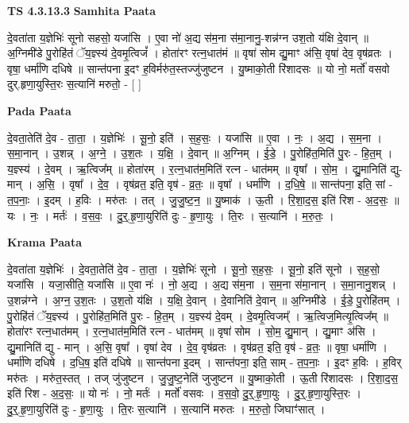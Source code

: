 \documentclass[17pt]{extarticle}
\begin{document}
\textbf{TS 4.3.13.3 } \newline
\textbf{Samhita Paata} \newline

दे॒वता॑ता य॒ज्ञेभिः॑ सूनो सहसो॒ यजा॑सि । ए॒वा नो॑ अ॒द्य स॑म॒ना स॑मा॒नानु॒-शन्न॑ग्न उश॒तो य॑क्षि दे॒वान् ॥ अ॒ग्निमी॑डे पु॒रोहि॑तं ॅय॒ज्ञ्स्य॑ दे॒वमृ॒त्विजं᳚ । होता॑रꣳ रत्न॒धात॑मं ॥ वृषा॑ सोम द्यु॒माꣳ अ॑सि॒ वृषा॑ देव॒ वृष॑व्रतः । वृषा॒ धर्मा॑णि दधिषे ॥ सान्त॑पना इ॒दꣳ ह॒विर्मरु॑त॒स्तज्जु॑जुष्टन । यु॒ष्माको॒ती रि॑शादसः ॥ यो नो॒ मर्तो॑ वसवो दुर्.हृणा॒युस्ति॒रः स॒त्यानि॑ मरुतो॒ - [  ] \newline

\textbf{Pada Paata} \newline

दे॒वता॒तेति॑ दे॒व - ता॒ता॒ । य॒ज्ञेभिः॑ । सू॒नो॒ इति॑ । स॒ह॒सः॒ । यजा॑सि ॥ ए॒वा । नः॒ । अ॒द्य । स॒म॒ना । स॒मा॒नान् । उ॒शन्न् । अ॒ग्ने॒ । उ॒श॒तः । य॒क्षि॒ । दे॒वान् ॥ अ॒ग्निम् । ई॒डे॒ । पु॒रोहि॑त॒मिति॑ पु॒रः - हि॒त॒म् । य॒ज्ञ्स्य॑ । दे॒वम् । ऋ॒त्विज᳚म् ॥ होता॑रम् । र॒त्न॒धात॑म॒मिति॑ रत्न - धात॑मम् ॥ वृषा᳚ । सो॒म॒ । द्यु॒मानिति॑ द्यु-मान् । अ॒सि॒ । वृषा᳚ । दे॒व॒ । वृष॑व्रत॒ इति॒ वृष॑ - व्र॒तः॒ ॥ वृषा᳚ । धर्मा॑णि । द॒धि॒षे॒ ॥ सान्त॑पना॒ इति॒ सां - त॒प॒नाः॒ । इ॒दम् । ह॒विः । मरु॑तः । तत् । जु॒जु॒ष्ट॒न॒ ॥ यु॒ष्माक॑ । ऊ॒ती । रि॒शा॒द॒स॒ इति॑ रिश - अ॒द॒सः॒ ॥ यः । नः॒ । मर्तः॑ । व॒स॒वः॒ । दु॒र्॒.हृ॒णा॒युरिति॑ दुः - हृ॒णा॒युः । ति॒रः । स॒त्यानि॑ । म॒रु॒तः॒ ।  \newline


\textbf{Krama Paata} \newline

दे॒वता॑ता य॒ज्ञेभिः॑ । दे॒वता॒तेति॑ दे॒व - ता॒ता॒ । य॒ज्ञेभिः॑ सूनो । सू॒नो॒ स॒ह॒सः॒ । सू॒नो॒ इति॑ सूनो । स॒ह॒सो॒ यजा॑सि । यजा॒सीति॒ यजा॑सि ॥ ए॒वा नः॑ । नो॒ अ॒द्य । अ॒द्य स॑म॒ना । स॒म॒ना स॑मा॒नान् । स॒मा॒नानु॒शन्न् । उ॒शन्न॑ग्ने । अ॒ग्न॒ उ॒श॒तः । उ॒श॒तो य॑क्षि । य॒क्षि॒ दे॒वान् । दे॒वानिति॑ दे॒वान् ॥ अ॒ग्निमी॑डे । ई॒डे॒ पु॒रोहि॑तम् । पु॒रोहि॑तं ॅय॒ज्ञ्स्य॑ । पु॒रोहि॑त॒मिति॑ पु॒रः - हि॒त॒म् । य॒ज्ञ्स्य॑ दे॒वम् । दे॒वमृ॒त्विजम्᳚ । ऋ॒त्विज॒मित्यृ॒त्विज᳚म् ॥ होता॑रꣳ रत्न॒धात॑मम् । र॒त्न॒धात॑म॒मिति॑ रत्न - धात॑मम् ॥ वृषा॑ सोम । सो॒म॒ द्यु॒मान् । द्यु॒माꣳ अ॑सि । द्यु॒मानिति॑ द्यु - मान् । अ॒सि॒ वृषा᳚ । वृषा॑ देव । दे॒व॒ वृष॑व्रतः । वृष॑व्रत॒ इति॒ वृष॑ - व्र॒तः॒ ॥ वृषा॒ धर्मा॑णि । धर्मा॑णि दधिषे । द॒धि॒ष॒ इति॑ दधिषे ॥ सान्त॑पना इ॒दम् । सान्त॑पना॒ इति॒ साम् - त॒प॒नाः॒ । इ॒दꣳ ह॒विः । ह॒विर् मरु॑तः । मरु॑त॒स्तत् । तज् जु॑जुष्टन । जु॒जु॒ष्ट॒नेति॑ जुजुष्टन ॥ यु॒ष्माको॒ती । ऊ॒ती रि॑शादसः । रि॒शा॒द॒स॒ इति॑ रिश - अ॒द॒सः॒ ॥ यो नः॑ । नो॒ मर्तः॑ । मर्तो॑ वसवः । व॒स॒वो॒ दु॒र्॒.हृ॒णा॒युः । दु॒र्॒.हृ॒णा॒युस्ति॒रः । दु॒र्॒.हृ॒णा॒युरिति॑ दुः - हृ॒णा॒युः । ति॒रः स॒त्यानि॑ । स॒त्यानि॑ मरुतः । म॒रु॒तो॒ जिघाꣳ॑सात् । \newline
\end{document}
